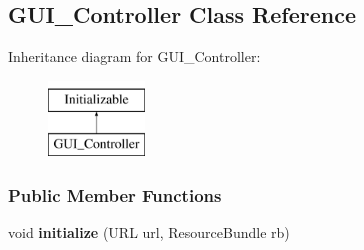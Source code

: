 \hypertarget{classGUI__Controller}{}\subsection{G\+U\+I\+\_\+\+Controller Class Reference}
\label{classGUI__Controller}
Inheritance diagram for G\+U\+I\+\_\+\+Controller\+:\begin{figure}[H]
\begin{center}
\leavevmode
\includegraphics[height=2.000000cm]{classGUI__Controller}
\end{center}
\end{figure}
\subsubsection*{Public Member Functions}
\begin{DoxyCompactItemize}
\item 
\mbox{\label{classGUI__Controller_aca7a1ba9eac5b2cd4e2aba8e84c478d8}} 
void {\bfseries initialize} (U\+RL url, Resource\+Bundle rb)
\end{DoxyCompactItemize}

